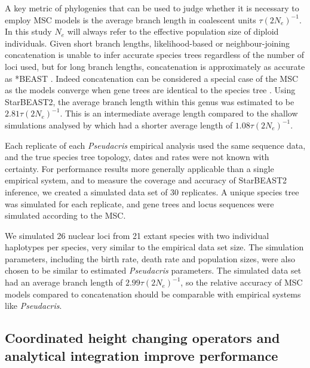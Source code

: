 \documentclass[nogrid]{MBE}%
\begin{document}
A key metric of phylogenies that can be used to judge whether it is necessary
to employ MSC models is the average branch length in coalescent units
$\tau(2N_e)^{-1}$. In this study $N_e$ will always refer to the
effective population size of diploid individuals. Given short branch lengths,
likelihood-based or neighbour-joining concatenation is unable to infer accurate
species trees regardless of the number of loci used, but for long branch
lengths, concatenation is approximately as accurate as *BEAST
\citep{Ogilvie01052016}. Indeed concatenation can be considered a special
case of the MSC as the models converge when gene
trees are identical to the species tree \citep{NYAS:NYAS12747}. Using StarBEAST2, the average branch length within
this genus was estimated to be $2.81\tau(2N_e)^{-1}$. This is an
intermediate average length compared to the shallow simulations analysed by
\cite{Ogilvie01052016} which had a shorter average length of
$1.08\tau(2N_e)^{-1}$.

Each replicate of each \textit{Pseudacris} empirical analysis used the same
sequence data, and the true species tree topology, dates and rates were not
known with certainty. For performance results more generally applicable than a
single empirical system, and to measure the coverage and accuracy of
StarBEAST2 inference, we created a simulated data set of 30 replicates. A
unique species tree was simulated for each replicate, and gene trees and locus
sequences were simulated according to the MSC.

We simulated 26 nuclear loci from 21 extant species with two individual
haplotypes per species, very similar to the empirical data set size. The
simulation parameters, including the birth rate, death rate and population
sizes, were also chosen to be similar to estimated \textit{Pseudacris}
parameters. The simulated data set had an average branch length of
$2.99\tau(2N_e)^{-1}$, so the relative accuracy of MSC models compared
to concatenation should be comparable with empirical systems like
\textit{Pseudacris}.

\subsection{Coordinated height changing operators and analytical integration improve performance}
\end{document}
